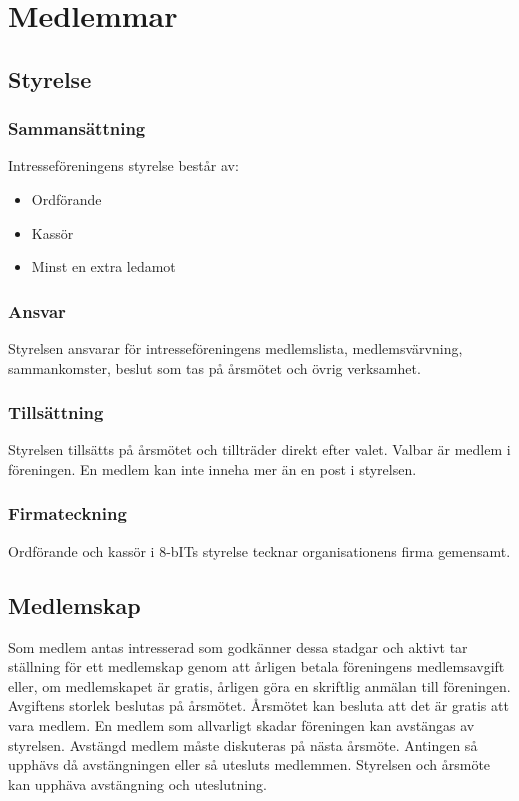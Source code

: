 \documentclass[11pt, noincludeaddress]{classes/cthit}
\begin{document}
\newpage

\section{Medlemmar}

\subsection{Styrelse}
\label{styrelse}

\subsubsection{Sammansättning}
Intresseföreningens styrelse består av:
\begin{itemize}
        \item Ordförande
		\item Kassör
		\item Minst en extra ledamot
\end{itemize}

\subsubsection{Ansvar}
Styrelsen ansvarar för intresseföreningens medlemslista,
medlemsvärvning, sammankomster, beslut som tas på årsmötet och övrig verksamhet.

\subsubsection{Tillsättning}
Styrelsen tillsätts på årsmötet och tillträder direkt efter valet. Valbar är medlem i föreningen. En medlem kan inte
inneha mer än en post i styrelsen.

\subsubsection{Firmateckning}
Ordförande och kassör i 8-bITs styrelse tecknar organisationens firma gemensamt.


\subsection{Medlemskap}
Som medlem antas intresserad som godkänner dessa stadgar och aktivt tar ställning för ett medlemskap genom
att årligen betala föreningens medlemsavgift eller, om medlemskapet är gratis, årligen göra en skriftlig anmälan
till föreningen. Avgiftens storlek beslutas på årsmötet. Årsmötet kan besluta att det är gratis att vara medlem. En medlem som allvarligt skadar föreningen kan avstängas av styrelsen. Avstängd medlem måste diskuteras på nästa
årsmöte. Antingen så upphävs då avstängningen eller så utesluts medlemmen. Styrelsen och årsmöte kan
upphäva avstängning och uteslutning.
\end{document}
